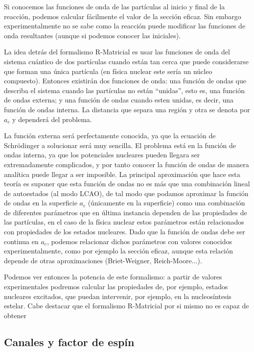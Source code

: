 \documentclass[fleqn,10pt]{SelfArx} %
\begin{document}
Si conocemos las funciones de onda de las partículas al inicio y final de la reacción, podemos calcular fácilmente el valor de la sección eficaz. Sin embargo experimentalmente no se sabe como la reacción puede modificar las funciones de onda resultantes (aunque si podemos conocer las iniciales). 

La idea detrás del formalismo R-Matricial es usar las funciones de onda del sistema cuántico de dos partículas cuando están tan cerca que puede considerarse que forman una única partícula (en física nuclear este sería un núcleo compuesto). Entonces existirán dos funciones de onda: una función de ondas que describa el sistema cuando las partículas no están ``unidas'', esto es, una función de ondas externa; y una función de ondas cuando esten unidas, es decir, una función de ondas interna. La distancia que separa una región y otra se denota por $a_c$ y dependerá del problema.

La función externa será perfectamente conocida, ya que la ecuación de Schrödinger a solucionar será muy sencilla. El problema está en la función de ondas interna, ya que los potenciales nucleares pueden llegara ser extremadamente complicados, y por tanto conocer la función de ondas de manera analítica puede llegar a ser imposible. La principal aproximación que hace esta teoría es suponer que esta función de ondas no es más que una combinación lineal de autoestados (al modo LCAO), de tal modo que podamos aproximar la función de ondas en la superficie $a_c$ (únicamente en la superficie) como una combinación de diferentes parámetros que en última instancia dependen de las propiedades de las partículas, en el caso de la física nuclear estos parámetros están relacionados con propiedades de los estados nucleares. Dado que la función de ondas debe ser continua en $a_c$, podemos relacionar dichos parámetros con valores conocidos experimentalmente, como por ejemplo la sección eficaz, aunque esta relación depende de otras aproximaciones (Briet-Weigner, Reich-Moore...).

Podemos ver entonces la potencia de este formalismo: a partir de valores experimentales podremos calcular las propiedades de, por ejemplo, estados nucleares excitados, que puedan intervenir, por ejemplo, en la nucleosíntesis estelar. Cabe destacar que el formalismo R-Matricial por si mismo no es capaz de obtener 



\subsection{Canales y factor de espín}
\end{document}
